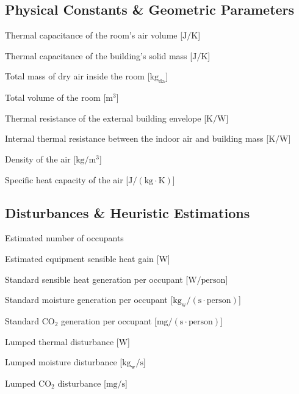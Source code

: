 \documentclass[12pt, a4paper]{article}
\begin{document}
	\subsection*{Physical Constants \& Geometric Parameters}
	\begin{description}[align=left, labelwidth=2.5cm, leftmargin=!]
		\item[$C_{\mathrm{air}}$] Thermal capacitance of the room's air volume [$\mathrm{J/K}$]
		\item[$C_{\mathrm{mass}}$] Thermal capacitance of the building's solid mass [$\mathrm{J/K}$]
		\item[$M_{\mathrm{air}}$] Total mass of dry air inside the room [$\mathrm{kg_{da}}$]
		\item[$V_{\mathrm{room}}$] Total volume of the room [$\mathrm{m^3}$]
		\item[$R_{\mathrm{ext}}$] Thermal resistance of the external building envelope [$\mathrm{K/W}$]
		\item[$R_{\mathrm{int}}$] Internal thermal resistance between the indoor air and building mass [$\mathrm{K/W}$]
		\item[$\rho_{\mathrm{air}}$] Density of the air [$\mathrm{kg/m^3}$]
		\item[$c_p$] Specific heat capacity of the air [$\mathrm{J/(kg \cdot K)}$]
	\end{description}
	
	\subsection*{Disturbances \& Heuristic Estimations}
	\begin{description}[align=left, labelwidth=2.5cm, leftmargin=!]
		\item[$N_{\mathrm{occ}}$] Estimated number of occupants
		\item[$Q_{\mathrm{equip}}$] Estimated equipment sensible heat gain [$\mathrm{W}$]
		\item[$q_{\mathrm{person}}$] Standard sensible heat generation per occupant [$\mathrm{W/person}$]
		\item[$g_{w,\mathrm{person}}$] Standard moisture generation per occupant [$\mathrm{kg_w/(s \cdot person)}$]
		\item[$g_{\mathrm{co2,person}}$] Standard $\mathrm{CO}_2$ generation per occupant [$\mathrm{mg/(s \cdot person)}$]
		\item[$d_T$] Lumped thermal disturbance [$\mathrm{W}$]
		\item[$d_W$] Lumped moisture disturbance [$\mathrm{kg_w/s}$]
		\item[$d_C$] Lumped $\mathrm{CO}_2$ disturbance [$\mathrm{mg/s}$]
	\end{description}
	
	
	
\end{document}
